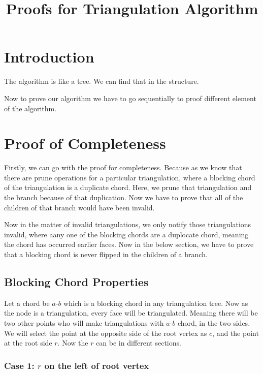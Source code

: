 \documentclass[12pt,a4paper]{article}
\title{Proofs for Triangulation Algorithm}
\author{}
\date{}
\begin{document}
\maketitle

\tableofcontents
\newpage

\section{Introduction}

The algorithm is like a tree. We can find that in the structure.

Now to prove our algorithm we have to go sequentially to proof different element of the algorithm.

\section{Proof of Completeness}

Firstly, we can go with the proof for completeness. Because as we know that there are prune operations for a particular triangulation, where a blocking chord of the triangulation is a duplicate chord. Here, we prune that triangulation and the branch because of that duplication. Now we have to prove that all of the children of that branch would have been invalid.

Now in the matter of invalid triangulations, we only notify those triangulations invalid, where aany one of the blocking chords are a duplocate chord, meaning the chord has occurred earlier faces. Now in the below section, we have to prove that a blocking chord is never flipped in the children of a branch.

\subsection{Blocking Chord Properties}

Let a chord be $a$-$b$ which is a blocking chord in any triangulation tree. Now as the node is a triangulation, every face will be triangulated. Meaning there will be two other points who will make triangulations with $a$-$b$ chord, in the two sides. We will select the point at the opposite side of the root vertex as $c$, and the point at the root side $r$. Now the $r$ can be in different sections.

\subsubsection{Case 1: $r$ on the left of root vertex}
\end{document}

